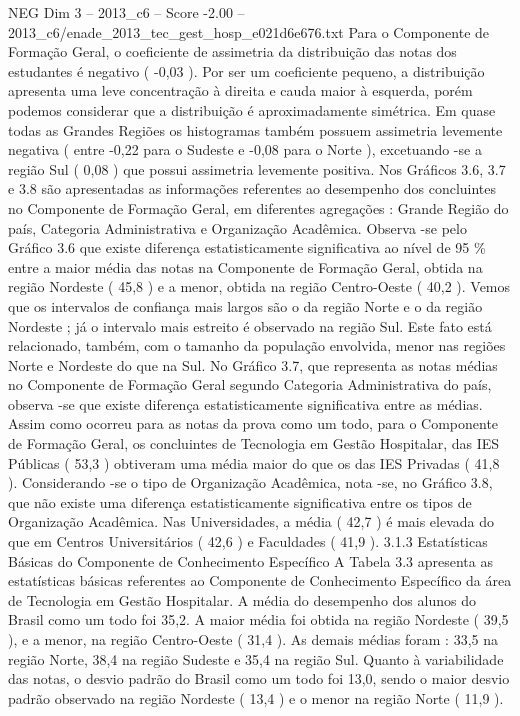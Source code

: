 \begin{textsample}{NEG Dim 3 – 2013\_c6 – Score -2.00 – 2013\_c6/enade\_2013\_tec\_gest\_hosp\_e021d6e676.txt}
Para o Componente de Formação Geral, o coeficiente de assimetria da distribuição das notas dos estudantes é negativo ( -0,03 ).
Por ser um coeficiente pequeno, a distribuição apresenta uma leve concentração à direita e cauda maior à esquerda, porém podemos considerar que a distribuição é aproximadamente simétrica.
Em quase todas as Grandes Regiões os histogramas também possuem assimetria levemente negativa ( entre -0,22 para o Sudeste e -0,08 para o Norte ), excetuando -se a região Sul ( 0,08 ) que possui assimetria levemente positiva.
Nos Gráficos 3.6, 3.7 e 3.8 são apresentadas as informações referentes ao desempenho dos concluintes no Componente de Formação Geral, em diferentes agregações : Grande Região do país, Categoria Administrativa e Organização Acadêmica.
Observa -se pelo Gráfico 3.6 que existe diferença estatisticamente significativa ao nível de 95 \% entre a maior média das notas na Componente de Formação Geral, obtida na região Nordeste ( 45,8 ) e a menor, obtida na região Centro-Oeste ( 40,2 ).
Vemos que os intervalos de confiança mais largos são o da região Norte e o da região Nordeste ; já o intervalo mais estreito é observado na região Sul.
Este fato está relacionado, também, com o tamanho da população envolvida, menor nas regiões Norte e Nordeste do que na Sul.
No Gráfico 3.7, que representa as notas médias no Componente de Formação Geral segundo Categoria Administrativa do país, observa -se que existe diferença estatisticamente significativa entre as médias.
Assim como ocorreu para as notas da prova como um todo, para o Componente de Formação Geral, os concluintes de Tecnologia em Gestão Hospitalar, das IES Públicas ( 53,3 ) obtiveram uma média maior do que os das IES Privadas ( 41,8 ).
Considerando -se o tipo de Organização Acadêmica, nota -se, no Gráfico 3.8, que não existe uma diferença estatisticamente significativa entre os tipos de Organização Acadêmica.
Nas Universidades, a média ( 42,7 ) é mais elevada do que em Centros Universitários ( 42,6 ) e Faculdades ( 41,9 ). 3.1.3 Estatísticas Básicas do Componente de Conhecimento Específico A Tabela 3.3 apresenta as estatísticas básicas referentes ao Componente de Conhecimento Específico da área de Tecnologia em Gestão Hospitalar.
A média do desempenho dos alunos do Brasil como um todo foi 35,2.
A maior média foi obtida na região Nordeste ( 39,5 ), e a menor, na região Centro-Oeste ( 31,4 ).
As demais médias foram : 33,5 na região Norte, 38,4 na região Sudeste e 35,4 na região Sul.
Quanto à variabilidade das notas, o desvio padrão do Brasil como um todo foi 13,0, sendo o maior desvio padrão observado na região Nordeste ( 13,4 ) e o menor na região Norte ( 11,9 ).

\end{textsample}
